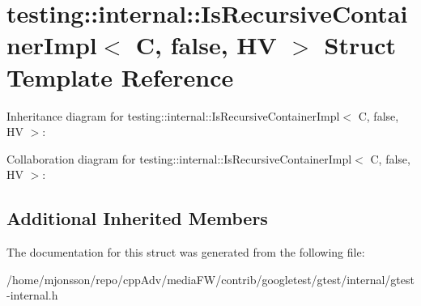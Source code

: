 \hypertarget{structtesting_1_1internal_1_1IsRecursiveContainerImpl_3_01C_00_01false_00_01HV_01_4}{}\section{testing\+:\+:internal\+:\+:Is\+Recursive\+Container\+Impl$<$ C, false, HV $>$ Struct Template Reference}
\label{structtesting_1_1internal_1_1IsRecursiveContainerImpl_3_01C_00_01false_00_01HV_01_4}


Inheritance diagram for testing\+:\+:internal\+:\+:Is\+Recursive\+Container\+Impl$<$ C, false, HV $>$\+:


Collaboration diagram for testing\+:\+:internal\+:\+:Is\+Recursive\+Container\+Impl$<$ C, false, HV $>$\+:
\subsection*{Additional Inherited Members}


The documentation for this struct was generated from the following file\+:\begin{DoxyCompactItemize}
\item 
/home/mjonsson/repo/cpp\+Adv/media\+F\+W/contrib/googletest/gtest/internal/gtest-\/internal.\+h\end{DoxyCompactItemize}
